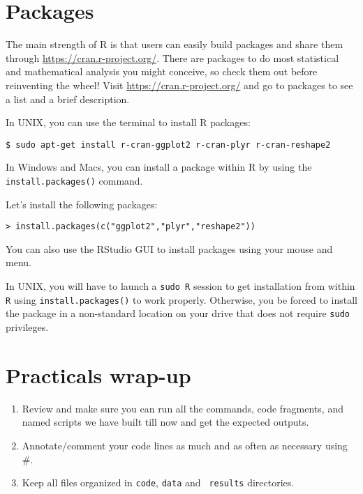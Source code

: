 \section{Packages}
The main strength of R is that users can easily build packages and 
share them through \url{https://cran.r-project.org/}. There are packages to do 
most statistical and mathematical analysis you might conceive, so check 
them out before reinventing the wheel! Visit \url{https://cran.r-project.org/} 
and go to packages to see a list and a brief description. 

In UNIX, you can use the terminal to install R packages:
\begin{lstlisting}
$ sudo apt-get install r-cran-ggplot2 r-cran-plyr r-cran-reshape2
\end{lstlisting}

In Windows and Macs, you can install a package within R by using the 
{\tt install.packages()} command. 

Let's install the following packages:
\begin{lstlisting}
> install.packages(c("ggplot2","plyr","reshape2"))
\end{lstlisting}

You can also use the RStudio GUI to install packages using your mouse 
and menu. 

\begin{tipbox}
In UNIX, you will have to launch a {\tt sudo R} session to get 
installation from within {\tt R} using  {\tt install.packages()} to work 
properly. Otherwise, you be forced to install the package in a 
non-standard location on your drive that does not require {\tt sudo} 
privileges.
\end{tipbox}


\section{Practicals wrap-up}

  \begin{enumerate}

	\item Review and make sure you can run all the commands, code 
	fragments, and named scripts we have built till now and get the 
	expected outputs.

	\item Annotate/comment your code lines as much and as often as necessary 
	using \#.
	
	\item Keep all files organized in {\tt code}, {\tt data} and {\tt 
	results} directories.
	 
   \end{enumerate}

